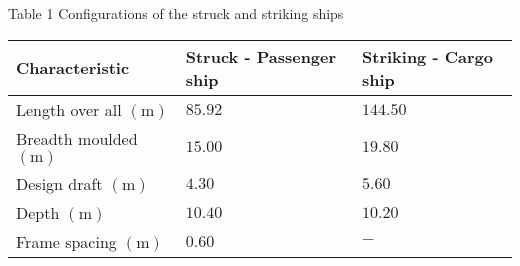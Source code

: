 \documentclass[../Final.tex]{subfiles}
\begin{document}
\begin{table}
    Table 1 Configurations of the struck and striking ships \\
    \begin{tabular}{lll}
    \hline 
    Characteristic & Struck - Passenger ship & Striking - Cargo ship \\
    \hline 
    Length over all $(\mathrm{m})$ & $85.92$ & $144.50$ \\
    Breadth moulded $(\mathrm{m})$ & $15.00$ & $19.80$ \\
    Design draft $(\mathrm{m})$ & $4.30$ & $5.60$ \\
    Depth $(\mathrm{m})$ & $10.40$ & $10.20$ \\
    Frame spacing $(\mathrm{m})$ & $0.60$ & $-$ \\
    \hline
    \end{tabular}
\end{table}
\end{document}

